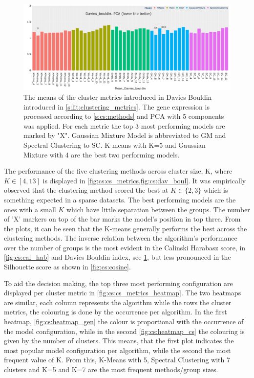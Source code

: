 \begin{figure}[!htb]    
    \centering
    \includegraphics[width=1.0\textwidth,keepaspectratio]{Sections/ClusteringAnalysis/Resources/cs_top3/PCA_top3_Davies_bouldin.png}
    \caption[Measuring clustering models: Davies Boulding]{The means of the cluster metrics introduced in Davies Bouldin introduced in \cref{s:lit:clustering_metrics}. The gene expression is processed according to \cref{s:cs:methods} and PCA with 5 components was applied. For each metric the top 3 most performing models are marked by "X". Gaussian Mixture Model is abbreviated to GM and Spectral Clustering to SC. K-means with K=5 and Gaussian Mixture with 4 are the best two performing models.}
    \label{fig:cs:dav_boul}
\end{figure}

The performance of the five clustering methods across cluster size, K, where $K\in[4, 13]$ is displayed in \cref{fig:cs:cs_metrics,fig:cs:dav_boul}. It was empirically observed that the clustering method scored the best at $K\in\{2,3\}$ which is something expected in a sparse datasets. The best performing models are the ones with a small $K$ which have little separation between the groups. The number of 'X' markers on top of the bar marks the model's position in top three. From the plots, it can be seen that the K-means generally performs the best across the clustering methods. The inverse relation between the algorithm's performance over the number of groups is the most evident in the Calinski Harabasz score, in \cref{fig:cs:cal_hab} and Davies Bouldin index, see \cref{fig:cs:dav_boul}, but less pronounced in the Silhouette score as shown in \cref{fig:cs:cosine}.


To aid the decision making, the top three most performing configuration are displayed per cluster metric in \cref{fig:cs:cs_metrics_heatmap}. The two heatmaps are similar, each column represents the algorithm while the rows the cluster metrics, the colouring is done by the occurrence per algorithm. In the first heatmap, \cref{fig:cs:heatmap_gen} the colour is proportional with the occurrence of the model configuration, while in the second \cref{fig:cs:heatmap_cs} the colouring is given by the number of clusters. This means, that the first plot indicates the most popular model configuration per algorithm, while the second the most frequent value of K. From this, K-Means with 5, Spectral Clustering with 7 clusters and K=5 and K=7 are the most frequent methods/group sizes. 

